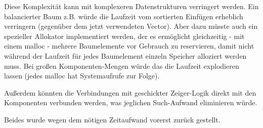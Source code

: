 Diese Komplexität kann mit komplexeren Datenstrukturen verringert werden. Ein balancierter Baum z.B. würde die Laufzeit vom sortierten Einfügen erheblich verringern (gegenüber dem jetzt verwendeten Vector). Aber dazu müsste auch ein spezieller Allokator implementiert werden, der es ermöglicht gleichzeitig - mit einem malloc - mehrere Baumelemente vor Gebrauch zu reservieren, damit nicht während der Laufzeit für jedes Baumelement einzeln Speicher alloziert werden muss. Bei großen Komponenten-Mengen würde das die Laufzeit explodieren lassen (jedes malloc hat Systemaufrufe zur Folge).

Außerdem könnten die Verbindungen mit geschickter Zeiger-Logik direkt mit den Komponenten verbunden werden, was jeglichen Such-Aufwand eliminieren würde.

Beides wurde wegen dem nötigen Zeitaufwand vorerst zurück gestellt.